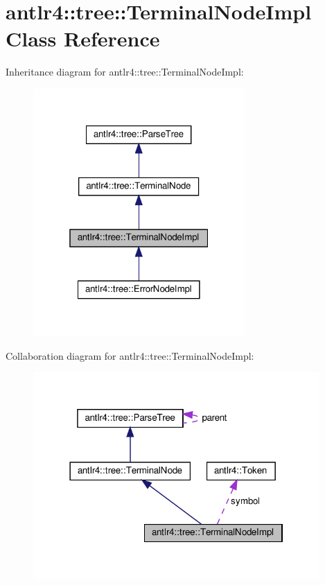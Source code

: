 \hypertarget{classantlr4_1_1tree_1_1TerminalNodeImpl}{}\section{antlr4\+:\+:tree\+:\+:Terminal\+Node\+Impl Class Reference}
\label{classantlr4_1_1tree_1_1TerminalNodeImpl}


Inheritance diagram for antlr4\+:\+:tree\+:\+:Terminal\+Node\+Impl\+:
\nopagebreak
\begin{figure}[H]
\begin{center}
\leavevmode
\includegraphics[width=229pt]{classantlr4_1_1tree_1_1TerminalNodeImpl__inherit__graph}
\end{center}
\end{figure}


Collaboration diagram for antlr4\+:\+:tree\+:\+:Terminal\+Node\+Impl\+:
\nopagebreak
\begin{figure}[H]
\begin{center}
\leavevmode
\includegraphics[width=310pt]{classantlr4_1_1tree_1_1TerminalNodeImpl__coll__graph}
\end{center}
\end{figure}

